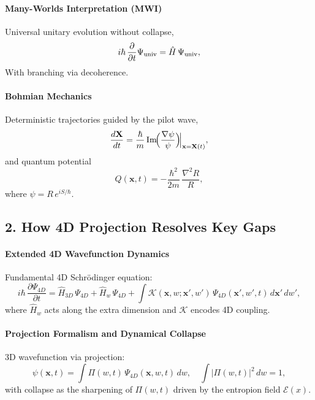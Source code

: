 \documentclass[12pt]{article}
\begin{document}
\paragraph{Many-Worlds Interpretation (MWI)}  
Universal unitary evolution without collapse,
\begin{equation}
i\hbar\,\frac{\partial}{\partial t}\Psi_{\rm univ}
= \hat H\,\Psi_{\rm univ},
\label{eq:mwi_unitary}
\end{equation}
With branching via decoherence.

\paragraph{Bohmian Mechanics}  
Deterministic trajectories guided by the pilot wave,
\begin{equation}
\frac{d\mathbf{X}}{dt}
= \frac{\hbar}{m}\,\mathrm{Im}\!\Bigl(\frac{\nabla\psi}{\psi}\Bigr)\!\Bigl|_{\mathbf{x}=\mathbf{X}(t)},
\label{eq:bohm_velocity}
\end{equation}
and quantum potential
\begin{equation}
Q(\mathbf{x},t) = -\frac{\hbar^2}{2m}\,\frac{\nabla^2 R}{R},
\label{eq:bohm_potential}
\end{equation}
where \(\psi=R\,e^{iS/\hbar}\).

\subsection*{2. How 4D Projection Resolves Key Gaps}

\paragraph{Extended 4D Wavefunction Dynamics}  
Fundamental 4D Schrödinger equation:
\begin{equation}
i\hbar\,\frac{\partial\Psi_{4D}}{\partial t}
= \hat{H}_{3D}\,\Psi_{4D}
+ \hat{H}_w\,\Psi_{4D}
+ \int \mathcal{K}(\mathbf{x},w;\mathbf{x}',w')\,\Psi_{4D}(\mathbf{x}',w',t)\,d\mathbf{x}'\,dw',
\label{eq:4d_schrodinger}
\end{equation}
where \(\hat{H}_w\) acts along the extra dimension and \(\mathcal{K}\) encodes 4D coupling.

\paragraph{Projection Formalism and Dynamical Collapse}  
3D wavefunction via projection:
\begin{equation}
\psi(\mathbf{x},t)
= \int \Pi(w,t)\,\Psi_{4D}(\mathbf{x},w,t)\,dw,
\quad \int|\Pi(w,t)|^2\,dw=1,
\label{eq:projection}
\end{equation}
with collapse as the sharpening of \(\Pi(w,t)\) driven by the entropion field \(\mathcal{E}(x)\).
\end{document}
